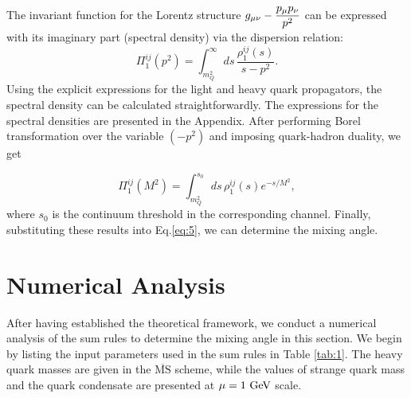 \documentclass[prd,a4paper,preprint,preprintnumbers,nofootinbib,superscriptaddress]{revtex4-2}
\begin{document}
The invariant function for the Lorentz structure $g_{\mu \nu} - \displaystyle{ p_\mu p_\nu \over p^2}$ can be expressed with its imaginary part (spectral density) via the dispersion relation:
%
\begin{equation}
  \label{eq:10}
  \Pi_1^{ i j}(p^2) = \int_{m_Q^2}^\infty ds \, \frac{\rho_1^{ij}(s)}{s - p^2}.
\end{equation}
%
Using the explicit expressions for the light and heavy quark propagators, the spectral density can be calculated straightforwardly.  The expressions for the spectral densities are presented in the Appendix. After performing Borel transformation over the variable \((-p^2)\) and imposing quark-hadron duality, we get

\begin{equation}
  \label{eq:11}
  \Pi_1^{ij}(M^2) = \int_{m_Q^2}^{s_0} ds \, \rho_1^{ij}(s) e^{-s /M^2},
\end{equation}
%
where \(s_0\) is the continuum threshold in the corresponding channel.
Finally, substituting these results into Eq.\eqref{eq:5}, we can determine the mixing angle.
%
\section{Numerical Analysis}
\label{sec:3}

After having established the theoretical framework, we conduct a numerical analysis of the sum rules to determine the mixing angle in this section. We begin by listing the input parameters used in the sum rules in Table \ref{tab:1}. The heavy quark masses are given in the $\overline{\text{MS}}$ scheme, while the values of strange quark mass and the quark condensate are presented at $\mu = 1~\rm{GeV}$ scale. 
\end{document}

